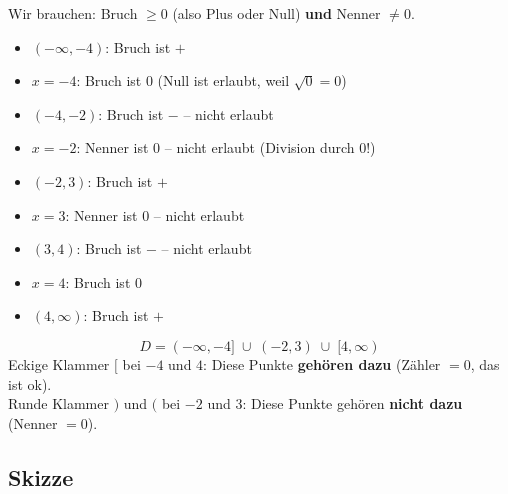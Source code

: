 \documentclass[12pt,a4paper]{article}
\begin{document}
Wir brauchen: Bruch $\ge 0$ (also Plus oder Null) \textbf{und} Nenner $\ne 0$.

\begin{itemize}
  \item $(-\infty, -4)$: Bruch ist $+$ \checkmark
  \item $x = -4$: Bruch ist $0$ \checkmark \quad (Null ist erlaubt, weil $\sqrt{0}=0$)
  \item $(-4, -2)$: Bruch ist $-$  -- nicht erlaubt
  \item $x = -2$: Nenner ist $0$  -- nicht erlaubt (Division durch 0!)
  \item $(-2, 3)$: Bruch ist $+$ \checkmark
  \item $x = 3$: Nenner ist $0$  -- nicht erlaubt
  \item $(3, 4)$: Bruch ist $-$  -- nicht erlaubt
  \item $x = 4$: Bruch ist $0$ \checkmark
  \item $(4, \infty)$: Bruch ist $+$ \checkmark
\end{itemize}

\begin{merkbox}[title={Ergebnis}]
\[
  D = (-\infty, -4] \;\cup\; (-2, 3) \;\cup\; [4, \infty)
\]
Eckige Klammer $[$ bei $-4$ und $4$: Diese Punkte \textbf{geh\"oren dazu} (Z\"ahler $= 0$, das ist ok).\\
Runde Klammer $)$ und $($ bei $-2$ und $3$: Diese Punkte geh\"oren \textbf{nicht dazu} (Nenner $= 0$).
\end{merkbox}

\subsection{Skizze}
\end{document}
